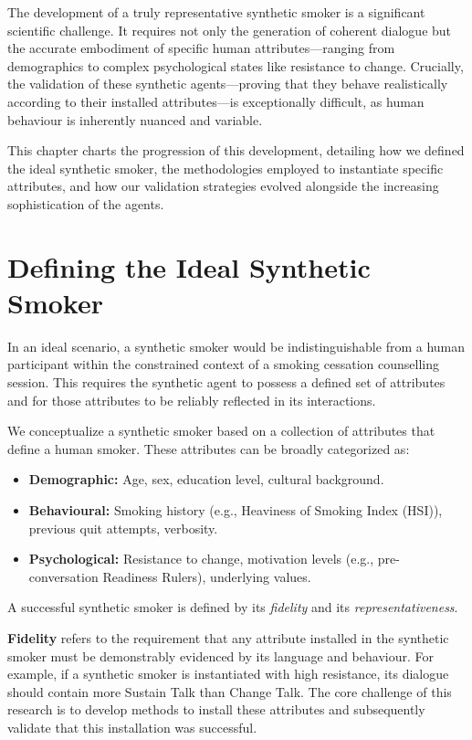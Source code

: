 The development of a truly representative synthetic smoker is a significant scientific challenge. It requires not only the generation of coherent dialogue but the accurate embodiment of specific human attributes—ranging from demographics to complex psychological states like resistance to change. Crucially, the validation of these synthetic agents—proving that they behave realistically according to their installed attributes—is exceptionally difficult, as human behaviour is inherently nuanced and variable.

This chapter charts the progression of this development, detailing how we defined the ideal synthetic smoker, the methodologies employed to instantiate specific attributes, and how our validation strategies evolved alongside the increasing sophistication of the agents.

\section{Defining the Ideal Synthetic Smoker}
\label{sec:synthetic-smoker-ideal}

In an ideal scenario, a synthetic smoker would be indistinguishable from a human participant within the constrained context of a smoking cessation counselling session. This requires the synthetic agent to possess a defined set of attributes and for those attributes to be reliably reflected in its interactions.

We conceptualize a synthetic smoker based on a collection of attributes that define a human smoker. These attributes can be broadly categorized as:

\begin{itemize}
    \item \textbf{Demographic:} Age, sex, education level, cultural background.
    \item \textbf{Behavioural:} Smoking history (e.g., Heaviness of Smoking Index (HSI)), previous quit attempts, verbosity.
    \item \textbf{Psychological:} Resistance to change, motivation levels (e.g., pre-conversation Readiness Rulers), underlying values.
\end{itemize}

A successful synthetic smoker is defined by its \textit{fidelity} and its \textit{representativeness}.

\textbf{Fidelity} refers to the requirement that any attribute installed in the synthetic smoker must be demonstrably evidenced by its language and behaviour. For example, if a synthetic smoker is instantiated with high resistance, its dialogue should contain more Sustain Talk than Change Talk. The core challenge of this research is to develop methods to install these attributes and subsequently validate that this installation was successful.

